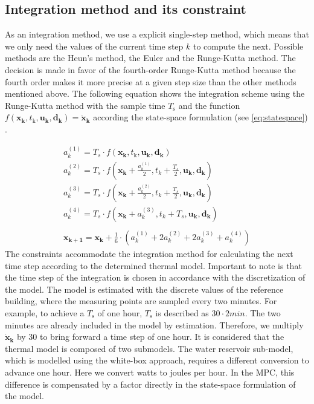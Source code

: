 \subsection{Integration method and its constraint}
\label{COnstaintIntegration}
As an integration method, we use a explicit single-step method, which means that we only need the values of the current time step $k$ to compute the next. Possible methods are the Heun's method, the Euler and the Runge-Kutta method. The decision is made in favor of the fourth-order Runge-Kutta method because the fourth order makes it more precise at a given step size than the other methods mentioned above. The following equation shows the integration scheme using the Runge-Kutta method with the sample time $T_\text{s}$ and the function $f(\mathbf{x_k},t_\text{k},\mathbf{u_k},\mathbf{d_k}) = \mathbf{\dot{x}_\text{k}}$ according the state-space formulation (see \autoref{eq:statespace}) \cite{KaiFurmansMarcusGeimerBalazsPritzCarstenProppe.WS1920}.

    \begin{align}
        \label{Runke-Kutta}
        a_k^{(1)} = T_s \cdot f(\mathbf{x_k},t_\text{k},\mathbf{u_k},\mathbf{d_k}) \\
        a_k^{(2)} = T_s \cdot f(\mathbf{x_k}+\frac{a_k^{(1)}}{2},t_k+\frac{T_s}{2},\mathbf{u_k},\mathbf{d_k})\nonumber\\
        a_k^{(3)} = T_s \cdot f(\mathbf{x_k}+\frac{a_k^{(2)}}{2},t_k+\frac{T_s}{2},\mathbf{u_k},\mathbf{d_k})\nonumber\\
        a_k^{(4)} = T_s \cdot f(\mathbf{x_k}+a_k^{(3)},t_k+T_s,\mathbf{u_k},\mathbf{d_k})\nonumber\\
        \nonumber\\
        \mathbf{x_{k+1}} = \mathbf{x_k} + \frac{1}{6}\cdot (a_k^{(1)} + 2 a_k^{(2)} + 2 a_k^{(3)} + a_k^{(4)})\nonumber
    \end{align}
The constraints accommodate the integration method for calculating the next time step according to the determined thermal model.
Important to note is that the time step of the integration is chosen in accordance with the discretization of the model. The model is estimated with the discrete values of the reference building, where the measuring points are sampled every two minutes. For example, to achieve a $T_\text{s}$ of one hour, $T_\text{s}$ is described as $30 \cdot 2 min$. The two minutes are already included in the model by estimation. Therefore, we multiply $\mathbf{\dot{x}_\text{k}}$ by 30 to bring forward a time step of one hour. It is considered that the thermal model is composed of two submodels. The water reservoir sub-model, which is modelled using the white-box approach, requires a different conversion to advance one hour. Here we convert watts to joules per hour. In the MPC, this difference is compensated by a factor directly in the state-space formulation of the model.

